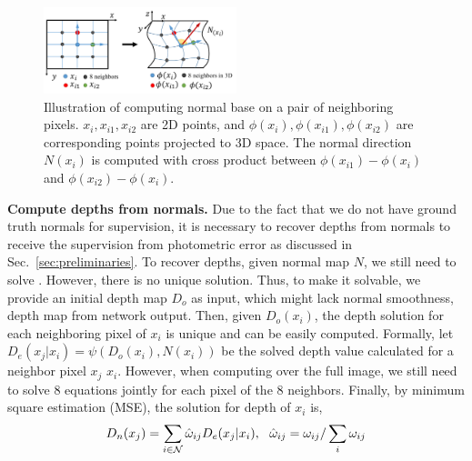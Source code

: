 \begin{figure}
\centering
\includegraphics[width=0.5\textwidth]{figures/d2n.pdf}
\caption{Illustration of computing normal base on a pair of neighboring pixels. $x_i, x_{i1}, x_{i2}$ are 2D points, and 
$\phi(x_i), \phi(x_{i1}), \phi(x_{i2})$ are corresponding points projected to 3D space. 
The normal direction $N(x_i)$ is computed with cross product between $\phi(x_{i1}) - \phi(x_i)$ and $\phi(x_{i2}) - \phi(x_i)$.}
\vspace{-0.3\baselineskip}
\label{fig:d2n}
\end{figure}

\textbf{Compute depths from normals.} 
Due to the fact that we do not have ground truth normals for supervision, it is necessary to recover depths from normals to receive the supervision from photometric error as discussed in Sec.~\ref{sec:preliminaries}.
To recover depths, given normal map $N$, we still need to solve . However, there is no unique solution. Thus, to make it solvable, we provide an initial depth map $D_o$ as input, which might lack normal smoothness, \eg depth map from network output. Then, given $D_o(x_i)$, the depth solution for each neighboring pixel of $x_i$ is unique and can be easily computed. Formally, let $D_e(x_j | x_i) = \psi(D_o(x_i), N(x_i))$ be the solved depth value calculated for a neighbor pixel $x_j$ \wrt $x_i$. 
However, when computing over the full image, we still need to solve 8 equations jointly for each pixel of the 8 neighbors. Finally, by minimum square estimation (MSE), the solution for depth of $x_i$ is,
\begin{align}
\label{eq:depth}
D_n(x_j) = \sum_{i\in{\mathcal N}}\hat{\omega}_{ij}D_e(x_j | x_i), \text{~~}
\hat{\omega}_{ij} = \omega_{ij} / \sum_i{\omega_{ij}}
\end{align}


